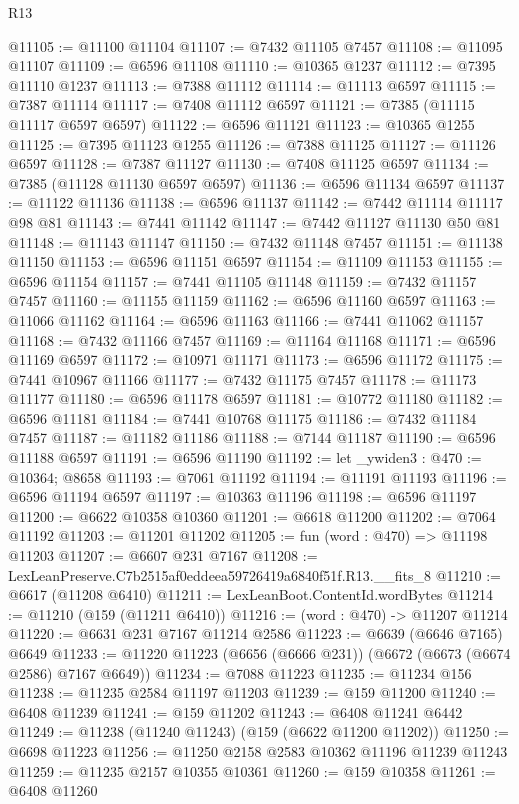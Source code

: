 \begin{lexlean}{R13}
\begin{coremodule}
@11105 := @11100 @11104
@11107 := @7432 @11105 @7457
@11108 := @11095 @11107
@11109 := @6596 @11108
@11110 := @10365 @1237
@11112 := @7395 @11110 @1237
@11113 := @7388 @11112
@11114 := @11113 @6597
@11115 := @7387 @11114
@11117 := @7408 @11112 @6597
@11121 := @7385 (@11115 @11117 @6597 @6597)
@11122 := @6596 @11121
@11123 := @10365 @1255
@11125 := @7395 @11123 @1255
@11126 := @7388 @11125
@11127 := @11126 @6597
@11128 := @7387 @11127
@11130 := @7408 @11125 @6597
@11134 := @7385 (@11128 @11130 @6597 @6597)
@11136 := @6596 @11134 @6597
@11137 := @11122 @11136
@11138 := @6596 @11137
@11142 := @7442 @11114 @11117 @98 @81
@11143 := @7441 @11142
@11147 := @7442 @11127 @11130 @50 @81
@11148 := @11143 @11147
@11150 := @7432 @11148 @7457
@11151 := @11138 @11150
@11153 := @6596 @11151 @6597
@11154 := @11109 @11153
@11155 := @6596 @11154
@11157 := @7441 @11105 @11148
@11159 := @7432 @11157 @7457
@11160 := @11155 @11159
@11162 := @6596 @11160 @6597
@11163 := @11066 @11162
@11164 := @6596 @11163
@11166 := @7441 @11062 @11157
@11168 := @7432 @11166 @7457
@11169 := @11164 @11168
@11171 := @6596 @11169 @6597
@11172 := @10971 @11171
@11173 := @6596 @11172
@11175 := @7441 @10967 @11166
@11177 := @7432 @11175 @7457
@11178 := @11173 @11177
@11180 := @6596 @11178 @6597
@11181 := @10772 @11180
@11182 := @6596 @11181
@11184 := @7441 @10768 @11175
@11186 := @7432 @11184 @7457
@11187 := @11182 @11186
@11188 := @7144 @11187
@11190 := @6596 @11188 @6597
@11191 := @6596 @11190
@11192 := let _ywiden3 : @470 := @10364; @8658
@11193 := @7061 @11192
@11194 := @11191 @11193
@11196 := @6596 @11194 @6597
@11197 := @10363 @11196
@11198 := @6596 @11197
@11200 := @6622 @10358 @10360
@11201 := @6618 @11200
@11202 := @7064 @11192
@11203 := @11201 @11202
@11205 := fun (word : @470) => @11198 @11203
@11207 := @6607 @231 @7167
@11208 := LexLeanPreserve.C7b2515af0eddeea59726419a6840f51f.R13.__fits_8
@11210 := @6617 (@11208 @6410)
@11211 := LexLeanBoot.ContentId.wordBytes
@11214 := @11210 (@159 (@11211 @6410))
@11216 := (word : @470) -> @11207 @11214
@11220 := @6631 @231 @7167 @11214 @2586
@11223 := @6639 (@6646 @7165) @6649
@11233 := @11220 @11223 (@6656 (@6666 @231)) (@6672 (@6673 (@6674 @2586) @7167 @6649))
@11234 := @7088 @11223
@11235 := @11234 @156
@11238 := @11235 @2584 @11197 @11203
@11239 := @159 @11200
@11240 := @6408 @11239
@11241 := @159 @11202
@11243 := @6408 @11241 @6442
@11249 := @11238 (@11240 @11243) (@159 (@6622 @11200 @11202))
@11250 := @6698 @11223
@11256 := @11250 @2158 @2583 @10362 @11196 @11239 @11243
@11259 := @11235 @2157 @10355 @10361
@11260 := @159 @10358
@11261 := @6408 @11260

\end{coremodule}
\end{lexlean}
